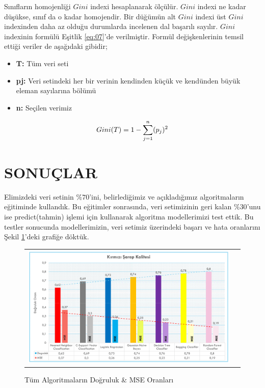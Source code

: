 \documentclass[conference]{IEEEtran}
\begin{document}
\quad Sınıfların homojenliği $Gini$ indexi hesaplanarak ölçülür. $Gini$ indexi ne kadar düşükse, sınıf da o kadar homojendir. Bir düğümün alt $Gini$ indexi üst $Gini$ indexinden daha az olduğu durumlarda incelenen dal başarılı sayılır\cite{21}. $Gini$ indexinin formülü Eşitlik \ref{eq:07}'de verilmiştir. Formül değişkenlerinin temsil ettiği veriler de aşağıdaki gibidir;

\begin{itemize}
\item \textbf{T:} Tüm veri seti
\item \textbf{pj:} Veri setindeki her bir verinin kendinden küçük ve kendünden büyük eleman sayılarına bölümü
\item \textbf{n:} Seçilen verimiz
\end{itemize}

\begin{equation}
\label{eq:07}
\Large Gini(T)=1-\sum_{j=1}^{n}(p_{j})^{2}
\end{equation}

\pagebreak
\section{\textbf{SONUÇLAR}}

\quad Elimizdeki veri setinin $\%70$'ini, belirlediğimiz ve açıkladığımız algoritmaların eğitiminde kullandık. Bu eğitimler sonrasında, veri setimizinin geri kalan $\%30$'unu ise predict(tahmin) işlemi için kullanarak algoritma modellerimizi test ettik. Bu testler sonucunda modellerimizin, veri setimiz üzerindeki başarı ve hata oranlarını Şekil \ref{fig:08}'deki grafiğe döktük.

\begin{figure}[!h]
	\centering
	\begin{center}
		\begin{tabular}{cc}
			\includegraphics[scale=0.15]{pictures/pic_08.png}&
		\end{tabular}
	\end{center}
	\caption{Tüm Algoritmaların Doğruluk \& MSE Oranları}
	\label{fig:08}
\end{figure}
\end{document}

